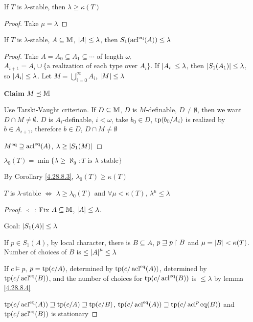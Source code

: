 \documentclass[11pt]{article}
\begin{document}
\begin{corollary}[]
\label{4.28.8.3}
If \(T\) is \(\lambda\)-stable, then \(\lambda\ge\kappa(T)\)
\end{corollary}

\begin{proof}
Take \(\mu=\lambda\)
\end{proof}

\begin{lemma}[]
\label{4.28.8.4}
If \(T\) is \(\lambda\)-stable, \(A\subseteq\mathbb{M}\), \(\abs{A}\le\lambda\), then \(S_1(\operatorname{acl}^{\operatorname{eq}}(A))\le\lambda\)
\end{lemma}

\begin{proof}
Take \(A=A_0\subseteq A_1\subseteq\cdots\) of length \(\omega\), \(A_{i+1}=A_i\cup\{\text{a realization of each type over }A_i\}\).
If \(\abs{A_i}\le\lambda\), then \(\abs{S_1(A_1)}\le\lambda\), so \(\abs{A_i}\le\lambda\).
Let \(M=\bigcup_{i=0}^\infty A_i\), \(\abs{M}\le\lambda\)

\textbf{Claim} \(M\preceq\mathbb{M}\)

Use Tarski-Vaught criterion. If \(D\subseteq\mathbb{M}\), \(D\) is \(M\)-definable, \(D\neq\emptyset\), then we
want \(D\cap M\neq\emptyset\). \(D\) is \(A_i\)-definable, \(i<\omega\), take \(b_0\in D\), \(\operatorname{tp}(b_0/A_i)\) is
realized by \(b\in A_{i+1}\), therefore \(b\in D\), \(D\cap M\neq\emptyset\)

\(M^{\operatorname{eq}}\supseteq\operatorname{acl}^{\operatorname{eq}}(A)\), \(\lambda\ge\abs{S_1(M)}\)
\end{proof}

\begin{definition}[]
\(\lambda_0(T)=\min\{\lambda\ge\aleph_0:T\text{ is $\lambda$-stable}\}\)
\end{definition}

By Corollary \ref{4.28.8.3}, \(\lambda_0(T)\ge\kappa(T)\)

\begin{theorem}[]
\(T\) is \(\lambda\)-stable \(\Leftrightarrow\) \(\lambda\ge\lambda_0(T)\) and \(\forall \mu<\kappa(T)\), \(\lambda^\mu\le\lambda\)
\end{theorem}

\begin{proof}
\(\Leftarrow\): Fix \(A\subseteq\mathbb{M}\), \(\abs{A}\le\lambda\).

Goal: \(\abs{S_1(A)}\le\lambda\)

If \(p\in S_1(A)\), by local character, there is \(B\subseteq A\), \(p\sqsupseteq p\upharpoonright B\) and \(\mu=\abs{B}<\kappa(T)\).
Number of choices of \(B\) is \(\le\abs{A}^\mu\le\lambda\)

If \(c\vDash p\), \(p=\operatorname{tp}(c/A)\), determined by \(\operatorname{tp}(c/\operatorname{acl}^{\operatorname{eq}}(A))\), determined
by \(\operatorname{tp}(c/\operatorname{acl}^{\operatorname{eq}}(B))\), and the number of choices for \(\operatorname{tp}(c/\operatorname{acl}^{\operatorname{eq}}(B))\)
is \(\le\lambda\) by lemma \ref{4.28.8.4}

\(\operatorname{tp}(c/\operatorname{acl}^{\operatorname{eq}}(A))\sqsupseteq\operatorname{tp}(c/A)\sqsupseteq\operatorname{tp}(c/B)\), \(\operatorname{tp}(c/\operatorname{acl}^{\operatorname{eq}}(A))\sqsupseteq\operatorname{tp}(c/\operatorname{acl}^p{\operatorname{eq}}(B))\)
and \(\operatorname{tp}(c/\operatorname{acl}^{\operatorname{eq}}(B))\) is stationary
\end{proof}
\end{document}

